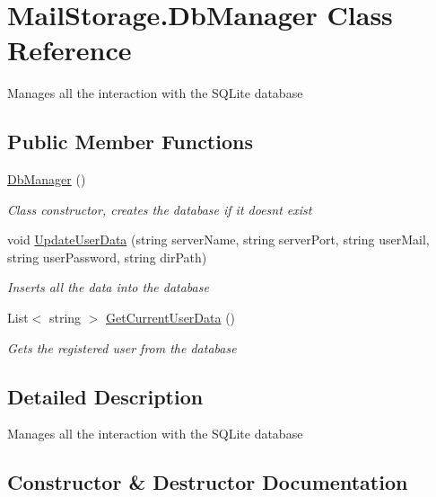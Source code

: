 \hypertarget{class_mail_storage_1_1_db_manager}{}\section{Mail\+Storage.\+Db\+Manager Class Reference}
\label{class_mail_storage_1_1_db_manager}


Manages all the interaction with the S\+Q\+Lite database  


\subsection*{Public Member Functions}
\begin{DoxyCompactItemize}
\item 
\hyperlink{class_mail_storage_1_1_db_manager_a2fce4fc8a19fd0f0de40091d2dc96931}{Db\+Manager} ()
\begin{DoxyCompactList}\small\item\em Class constructor, creates the database if it doesn\textquotesingle{}t exist \end{DoxyCompactList}\item 
void \hyperlink{class_mail_storage_1_1_db_manager_a862704b090f1a99e33682f701c6f8ba2}{Update\+User\+Data} (string server\+Name, string server\+Port, string user\+Mail, string user\+Password, string dir\+Path)
\begin{DoxyCompactList}\small\item\em Inserts all the data into the database \end{DoxyCompactList}\item 
List$<$ string $>$ \hyperlink{class_mail_storage_1_1_db_manager_add360de0a5bb47870412e69741da22f3}{Get\+Current\+User\+Data} ()
\begin{DoxyCompactList}\small\item\em Gets the registered user from the database \end{DoxyCompactList}\end{DoxyCompactItemize}


\subsection{Detailed Description}
Manages all the interaction with the S\+Q\+Lite database 



\subsection{Constructor \& Destructor Documentation}
\mbox{\label{class_mail_storage_1_1_db_manager_a2fce4fc8a19fd0f0de40091d2dc96931}} 
